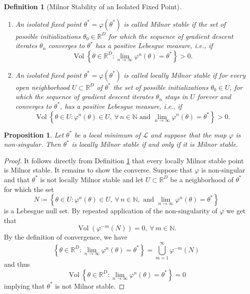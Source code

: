 \documentclass[10pt,a4paper]{amsart}
\newtheorem{definition}{Definition}
\newtheorem{proposition}{Proposition}
\newcommand{\R}{{\mathbb R}}
\begin{document}
\begin{definition}[Milnor Stability of an Isolated Fixed Point]\label{cekk_def:Milnor}~
	\begin{enumerate}
		\item[(i)]An isolated fixed point $\theta^* = \varphi(\theta^*)$ is called \emph{Milnor stable} if the set of possible initializations $\theta_0\in \R^D$ for which the sequence of gradient descent iterates $\theta_n$ converges to $\theta^*$ has a positive Lebesgue measure, i.e., if
		$$\operatorname{Vol}\left\{\theta \in \R^D : \lim_{n \to \infty} \varphi^n(\theta) = \theta^*\right\}>0.$$
		\item[(ii)]An isolated fixed point $\theta^* = \varphi(\theta^*)$ is called \emph{locally Milnor stable} if for every open neighborhood $U\subset \R^D$ of $\theta^*$ the set of possible initializations $\theta_0\in U$, for which the sequence of gradient descent iterates $\theta_n$ stays in $U$ forever and converges to $\theta^*$, has a positive Lebesgue measure, i.e., if
		$$\operatorname{Vol}\left\{\theta \in U : \varphi^n(\theta) \in U,~\forall\,n \in \mathbb N \text{ and }\lim_{n \to \infty} \varphi^n(\theta) = \theta^*\right\}>0.$$
	\end{enumerate}
\end{definition}

\begin{proposition}\label{cekk_prop:LocGlobEqui}
	Let $\theta^*$ be a local minimum of $\mathcal L$ and suppose that the map $\varphi$ is non-singular. Then $\theta^*$ is locally Milnor stable if and only if it is Milnor stable.
\end{proposition}

\begin{proof}
	It follows directly from Definition \ref{cekk_def:Milnor} that every locally Milnor stable point is Milnor stable. It remains to show the converse. Suppose that $\varphi$ is non-singular and that $\theta^*$ is not locally Milnor stable and let $U\subset \R^D$ be a neighborhood of $\theta^*$ for which the set
	$$N\coloneqq \left\{\theta \in U : \varphi^n(\theta) \in U,~\forall\,n \in \mathbb N, \text{ and }\lim_{n \to \infty} \varphi^n(\theta) = \theta^*\right\}$$
	is a Lebesgue null set. By repeated application of the non-singularity of $\varphi$ we get that
	$$\operatorname{Vol}\left(\varphi^{-m}(N)\right) = 0, ~\forall\, m \in \mathbb N.$$
	By the definition of convergence, we have
	$$\left\{\theta \in \R^D : \lim_{n \to \infty} \varphi^n(\theta) = \theta^*\right\} = \bigcup_{m = 1}^\infty \varphi^{-m}(N)$$
	and thus 
	$$\operatorname{Vol}\left\{\theta \in \R^D : \lim_{n \to \infty} \varphi^n(\theta) = \theta^*\right\}=0$$
	implying that $\theta^*$ is not Milnor stable.
\end{proof}
\end{document}

